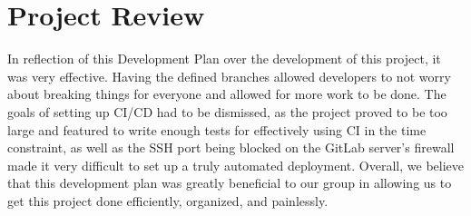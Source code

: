 \documentclass{article}
\begin{document}
\section{Project Review}
In reflection of this Development Plan over the development of this project, it was very effective. Having the defined branches allowed developers to not worry about breaking things for everyone and allowed for more work to be done. The goals of setting up CI/CD had to be dismissed, as the project proved to be too large and featured to write enough tests for effectively using CI in the time constraint, as well as the SSH port being blocked on the GitLab server's firewall made it very difficult to set up a truly automated deployment. Overall, we believe that this development plan was greatly beneficial to our group in allowing us to get this project done efficiently, organized, and painlessly.
\end{document}

